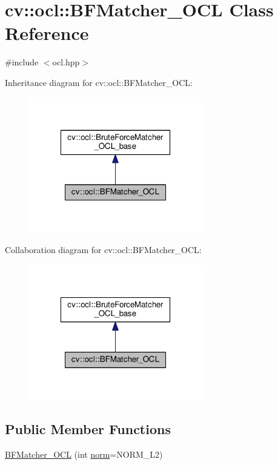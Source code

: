 \hypertarget{classcv_1_1ocl_1_1BFMatcher__OCL}{\section{cv\-:\-:ocl\-:\-:B\-F\-Matcher\-\_\-\-O\-C\-L Class Reference}
\label{classcv_1_1ocl_1_1BFMatcher__OCL}
}


{\ttfamily \#include $<$ocl.\-hpp$>$}



Inheritance diagram for cv\-:\-:ocl\-:\-:B\-F\-Matcher\-\_\-\-O\-C\-L\-:\nopagebreak
\begin{figure}[H]
\begin{center}
\leavevmode
\includegraphics[width=214pt]{classcv_1_1ocl_1_1BFMatcher__OCL__inherit__graph}
\end{center}
\end{figure}


Collaboration diagram for cv\-:\-:ocl\-:\-:B\-F\-Matcher\-\_\-\-O\-C\-L\-:\nopagebreak
\begin{figure}[H]
\begin{center}
\leavevmode
\includegraphics[width=214pt]{classcv_1_1ocl_1_1BFMatcher__OCL__coll__graph}
\end{center}
\end{figure}
\subsection*{Public Member Functions}
\begin{DoxyCompactItemize}
\item 
\hyperlink{classcv_1_1ocl_1_1BFMatcher__OCL_a3155f4c0e93ec8774968e22f8dff5949}{B\-F\-Matcher\-\_\-\-O\-C\-L} (int \hyperlink{namespacecv_1_1ocl_a3f4937f7257ac5ebce3feff0dffcbde1}{norm}=N\-O\-R\-M\-\_\-\-L2)
\end{DoxyCompactItemize}
